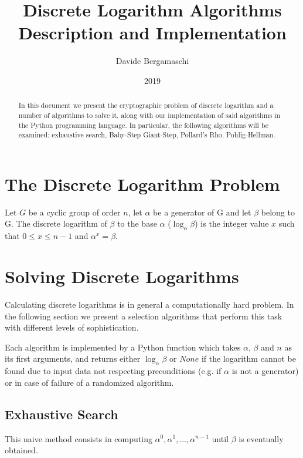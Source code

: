 \documentclass[UTF8]{article}
\begin{document}
\title{
    Discrete Logarithm Algorithms \\
    \large Description and Implementation
}
\author{Davide Bergamaschi}
\date{2019}
\maketitle

\begin{abstract}
\noindent In this document we present the cryptographic problem of discrete logarithm and a number of algorithms to solve it, along with our implementation of said algorithms in the Python programming language. In particular, the following algorithms will be examined: exhaustive search, Baby-Step Giant-Step, Pollard's Rho, Pohlig-Hellman.
\end{abstract}

\section{The Discrete Logarithm Problem}

Let $G$ be a cyclic group of order $n$, let $\alpha$ be a generator of G and let $\beta$ belong to G. The discrete logarithm of $\beta$ to the base $\alpha$ ($\log_{\alpha}\beta$) is the integer value $x$ such that $0 \leq x \leq n - 1$ and $\alpha^x=\beta$.

\section{Solving Discrete Logarithms}

Calculating discrete logarithms is in general a computationally hard problem. In the following section we present a selection algorithms that perform this task with different levels of sophistication.

Each algorithm is implemented by a Python function which takes $\alpha$, $\beta$ and $n$ as its first arguments, and returns either $\log_{\alpha}\beta$ or $None$ if the logarithm cannot be found due to input data not respecting preconditions (e.g. if $\alpha$ is not a generator) or in case of failure of a randomized algorithm.

\newpage

\subsection{Exhaustive Search}

This naive method consists in computing $\alpha^0, \alpha^1, \ldots, \alpha^{n - 1}$ until $\beta$ is eventually obtained.
\end{document}
